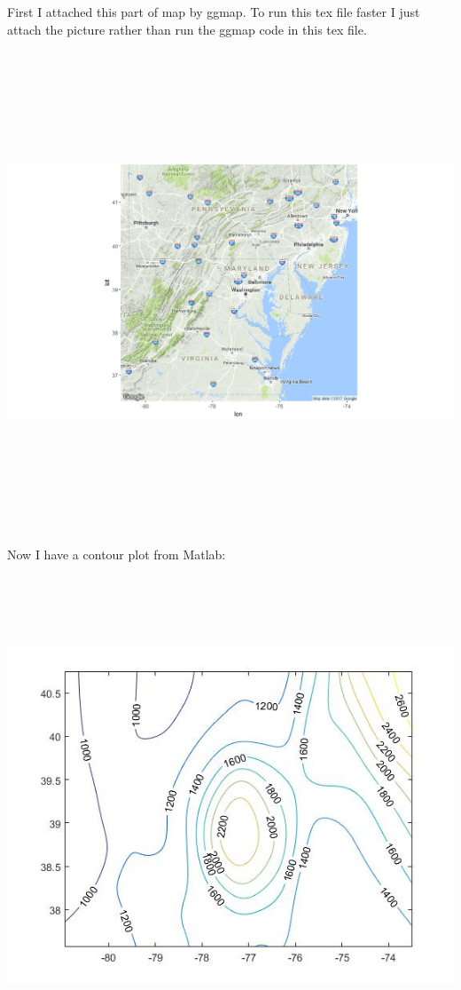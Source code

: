 \documentclass{article}
\begin{document}



First I attached this part of map by ggmap. To run this tex file faster I just attach the picture rather than run the ggmap code in this tex file.\\
\includegraphics[width=15cm,height=15cm,keepaspectratio]{Rplot}\\
Now I have a contour plot from Matlab:\\
\includegraphics[width=15cm,height=15cm,keepaspectratio]{contour}\\
\end{document}
